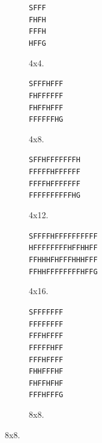     \begin{figure}
        \centering
        \begin{subfigure}[b]{0.2\textwidth}
            \centering
            \texttt{SFFF} \\
            \texttt{FHFH} \\
            \texttt{FFFH} \\
            \texttt{HFFG}
            \caption{4x4.}
        \end{subfigure}
        \begin{subfigure}[b]{0.3\textwidth}
            \centering
            \texttt{SFFFHFFF} \\
            \texttt{FHFFFFFF} \\
            \texttt{FHFFHFFF} \\
            \texttt{FFFFFFHG}
            \caption{4x8.}
        \end{subfigure}
        \begin{subfigure}[b]{0.3\textwidth}
            \centering
            \texttt{SFFHFFFFFFFH} \\
            \texttt{FFFFFHFFFFFF} \\
            \texttt{FFFFHFFFFFFF} \\
            \texttt{FFFFFFFFFFHG}
            \caption{4x12.}
        \end{subfigure}
        \begin{subfigure}[b]{0.4\textwidth}
            \centering
            \texttt{SFFFFHFFFFFFFFFF} \\
            \texttt{HFFFFFFFFHFFHHFF} \\
            \texttt{FFHHHFHFFFHHHFFF} \\
            \texttt{FFHHFFFFFFFFHFFG}
            \caption{4x16.}
        \end{subfigure}
        \begin{subfigure}[b]{0.3\textwidth}
            \centering
            \texttt{SFFFFFFF} \\
            \texttt{FFFFFFFF} \\
            \texttt{FFFHFFFF} \\
            \texttt{FFFFFHFF} \\
            \texttt{FFFHFFFF} \\
            \texttt{FHHFFFHF} \\
            \texttt{FHFFHFHF} \\
            \texttt{FFFHFFFG}
            \caption{8x8.}
        \end{subfigure}

\end{figure}

